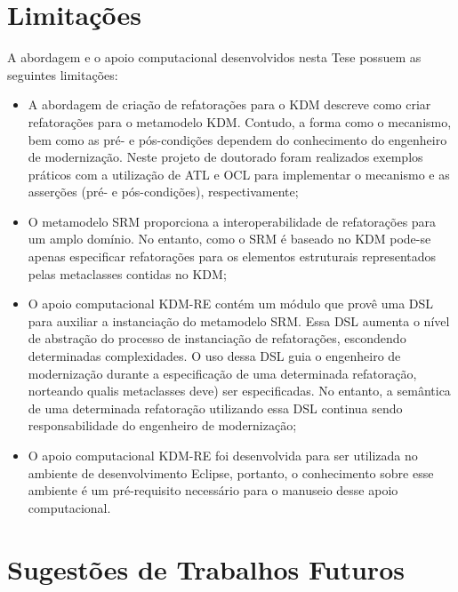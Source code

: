 \section{Limitações}\label{sec:limitacoes_trabalho}

A abordagem e o apoio computacional desenvolvidos nesta Tese possuem as seguintes limitações:

\begin{itemize}

\item A abordagem de criação de refatorações para o KDM descreve como criar refatorações para o metamodelo KDM. Contudo, a forma como o mecanismo, bem como as pré- e pós-condições dependem do conhecimento do engenheiro de modernização. Neste projeto de doutorado foram realizados exemplos práticos com a utilização de ATL e OCL para implementar o mecanismo e as asserções (pré- e pós-condições), respectivamente;

\item O metamodelo SRM proporciona a interoperabilidade de refatorações para um amplo domínio. No entanto, como o SRM é baseado no KDM pode-se apenas especificar refatorações para os elementos estruturais representados pelas metaclasses contidas no KDM;  


\item O apoio computacional KDM-RE contém um módulo que provê uma DSL para auxiliar a instanciação do metamodelo SRM. Essa DSL aumenta o nível de abstração do processo de instanciação de refatorações, escondendo determinadas complexidades. O uso dessa DSL guia o engenheiro de modernização durante a especificação de uma determinada refatoração, norteando qualis metaclasses deve) ser especificadas. No entanto, a semântica de uma determinada refatoração utilizando essa DSL continua sendo responsabilidade do engenheiro de modernização;


\item O apoio computacional KDM-RE foi desenvolvida para ser utilizada no ambiente de desenvolvimento Eclipse, portanto, o conhecimento sobre esse ambiente é um pré-requisito necessário para o manuseio desse apoio computacional.
\end{itemize}

\section{Sugestões de Trabalhos Futuros}\label{sec:trabalhos_futuros_tese}

